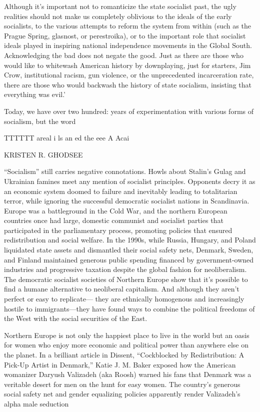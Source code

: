 \par 
Although it’s important not to romanticize the state socialist past, the ugly realities should not make us completely oblivious to the ideals of the early socialists, to the various attempts to reform the system from within (such as the Prague Spring, glasnost, or perestroika), or to the important role that socialist ideals played in inspiring national independence movements in the Global South. Acknowledging the bad does not negate the good. Just as there are those who would like to whitewash American history by downplaying, just for starters, Jim Crow, institutional racism, gun violence, or the unprecedented incarceration rate, there are those who would backwash the history of state socialism, insisting that everything was evil.’
 \par 
Today, we have over two hundred: years of experimentation with various forms of socialism, but the word
 \par 
TTTTTT areal i ls an ed the eee A Acai
 \par 
KRISTEN R. GHODSEE
 \par 
“Socialism” still carries negative connotations. Howls about Stalin’s Gulag and Ukrainian famines meet any mention of socialist principles. Opponents decry it as an economic system doomed to failure and inevitably leading to totalitarian terror, while ignoring the successful democratic socialist nations in Scandinavia. Europe was a battleground in the Cold War, and the northern European countries once had large, domestic communist and socialist parties that participated in the parliamentary process, promoting policies that ensured redistribution and social welfare. In the 1990s, while Russia, Hungary, and Poland liquidated state assets and dismantled their social safety nets, Denmark, Sweden, and Finland maintained generous public spending financed by government-owned industries and progressive taxation despite the global fashion for neoliberalism. The democratic socialist societies of Northern Europe show that it’s possible to find a humane alternative to neoliberal capitalism. And although they aren't perfect or easy to replicate— they are ethnically homogenous and increasingly hostile to immigrants—they have found ways to combine the political freedoms of the West with the social securities of the East.
 \par 
Northern Europe is not only the happiest place to live in the world but an oasis for women who enjoy more economic and political power than anywhere else on the planet. In a brilliant article in Dissent, “Cockblocked by Redistribution: A Pick-Up Artist in Denmark,” Katie J. M. Baker exposed how the American womanizer Daryush Valizadeh (aka Roosh) warned his fans that Denmark was a veritable desert for men on the hunt for easy women. The country’s generous social safety net and gender equalizing policies apparently render Valizadeh’s alpha male seduction

